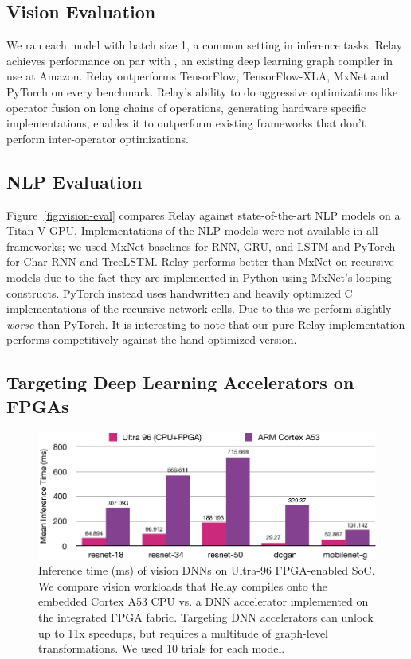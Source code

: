   \subsection{Vision Evaluation}
  We ran each model with
    batch size 1, a common setting in inference tasks.
  Relay achieves performance on par with \nnvm,
    an existing deep learning graph compiler in use at Amazon.
  Relay outperforms TensorFlow, TensorFlow-XLA, MxNet and
    PyTorch on every benchmark.
  Relay's ability to do aggressive optimizations like operator
    fusion on long chains of operations, generating hardware
    specific implementations, enables it to outperform
    existing frameworks that don't perform inter-operator optimizations.

  \subsection{NLP Evaluation}
  Figure~\ref{fig:vision-eval} compares Relay against state-of-the-art NLP models on a Titan-V GPU.
  Implementations of the NLP models were not available in all frameworks;
    we used MxNet baselines for RNN, GRU, and LSTM and PyTorch for Char-RNN and TreeLSTM.
  Relay performs better than MxNet on recursive models
    due to the fact they are implemented in Python using
    MxNet's looping constructs.
  PyTorch instead uses handwritten and heavily optimized
    C implementations of the recursive network cells.
  Due to this we perform slightly \emph{worse} than PyTorch.
  It is interesting to note that our pure Relay
    implementation performs competitively against
    the hand-optimized version.

  \subsection{Targeting Deep Learning Accelerators on FPGAs}

  \begin{figure}[h]
    \includegraphics[width=\textwidth]{fig_splash19/eval/vision_fpga.pdf}
    \caption{
      Inference time (ms) of vision DNNs on Ultra-96 FPGA-enabled SoC.
      We compare vision workloads that Relay compiles onto the embedded Cortex
        A53 CPU vs. a DNN accelerator implemented on the integrated FPGA fabric.
      Targeting DNN accelerators can unlock up to 11x speedups, but requires a
        multitude of graph-level transformations.
      We used 10 trials for each model.
    }
    \label{fig:fpga-eval}
  \end{figure}

